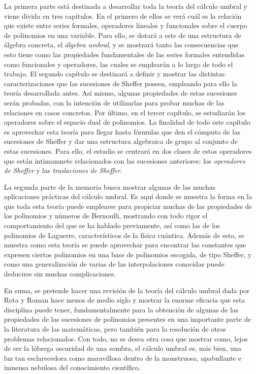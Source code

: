 La primera parte está destinada a desarrollar toda la teoría del cálculo umbral y viene divida en tres capítulos. En el primero de ellos se verá cuál es la relación que existe entre series formales, operadores lineales y funcionales sobre el cuerpo de polinomios en una variable. Para ello, se dotará a este de una estructura de álgebra concreta, el \textit{álgebra umbral}, y se mostrará tanto las consecuencias que esto tiene como las propiedades fundamentales de las series formales entendidas como funcionales y operadores, las cuales se emplearán a lo largo de todo el trabajo. El segundo capítulo se destinará a definir y mostrar las distintas caracterizaciones que las sucesiones de Sheffer poseen, empleando para ello la teoría desarrollada antes. Así mismo, algunas propiedades de estas sucesiones serán probadas, con la intención de utilizarlas para probar muchas de las relaciones en casos concretos. Por último, en el tercer capítulo, se estudiarán los operadores sobre el espacio dual de polinomios. La finalidad de todo este capítulo es aprovechar esta teoría para llegar hasta fórmulas que den el cómputo de las sucesiones de Sheffer y dar una estructura algebraica de grupo al conjunto de estas sucesiones. Para ello, el estudio se centrará en dos clases de estos operadores que están intimamnete relacionados con las sucesiones anteriores: los \textit{operadores de Sheffer} y las \textit{traslaciones de Sheffer}. 

La segunda parte de la memoria busca mostrar algunas de las muchas aplicaciones prácticas del cálculo umbral. Es aquí donde se muestra la forma en la que toda esta teoría puede emplearse para propiciar muchas de las propiedades de los polinomios y números de Bernoulli, mostrando con todo rigor el comportamiento del que se ha hablado previamente, así como las de los polinomios de Laguerre, característicos de la física cuántica. Además de esto, se muestra como esta teoría se puede aprovechar para encontrar las constantes que expresen ciertos polinomios en una base de polinomios escogida, de tipo Sheffer, y como una generalización de varias de las interpolaciones conocidas puede deducirse sin muchas complicaciones. 

En suma, se pretende hacer una revisión de la teoría del cálculo umbral dada por Rota y Roman hace menos de medio siglo y mostrar la enorme eficacia que esta disciplina puede tener, fundamentalmente para la obtención de algunas de las propiedades de las sucesiones de polinomios presentes en una importante parte de la literatura de las matemáticas, pero también para la resolución de otros problemas relacionados. Con todo, no se desea otra cosa que mostrar como, lejos de ser la lóbrega oscuridad de una sombra, el cálculo umbral es, más bien, una luz tan esclarecedora como maravillosa dentro de la monstruosa, apabullante e inmensa nebulosa del conocimiento científico.
